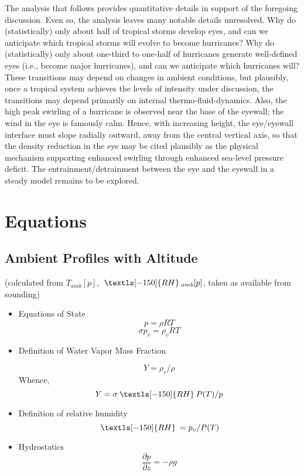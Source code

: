 \documentclass[preprint, prX]{revtex4}
\newcommand{\pd}[2]{\frac{\partial#1}{\partial#2}}
\newcommand{\rh}{\:\textls[-150]{RH}\:}
\begin{document}
The analysis that follows provides quantitative details in support of the foregoing discussion. Even so, the analysis leaves many notable details unresolved. Why do (statistically) only about half of tropical storms develop eyes, and can we anticipate which tropical storms will evolve to become hurricanes? Why do (statistically) only about one-third to one-half of hurricanes generate well-defined eyes (i.e., become major hurricanes), and can we anticipate which hurricanes will? These transitions may depend on changes in ambient conditions, but plausibly, once a tropical system achieves the levels of intensity under discussion, the transitions may depend primarily on internal thermo-fluid-dynamics. Also, the high peak swirling of a hurricane is observed near the base of the eyewall; the wind in the eye is famously calm. Hence, with increasing height, the eye/eyewall interface must slope radially outward, away from the central vertical axis, so that the density reduction in the eye may be cited plausibly as the physical mechanism supporting enhanced swirling through enhanced sea-level pressure deficit. The entrainment/detrainment between the eye and the eyewall in a steady model remains to be explored.

\section{Equations}

\subsection{Ambient Profiles with Altitude  }
(calculated from $T_{amb}[p]$, $ \rh_{amb}[p]$, taken as available from sounding)
\begin{itemize}

\item Equations of State
\begin{equation}
	p = \rho R T
\end{equation}
\begin{equation}
	\sigma p_v = \rho_v R T
\end{equation}

\item Definition of Water Vapor Mass Fraction

\begin{equation}
	Y = \rho_v / \rho
\end{equation}
Whence,
\begin{equation}
	Y = \sigma \rh P(T) / p
\end{equation}

\item Definition of relative humidity
\begin{equation}
	\rh = p_v / P(T)
\end{equation}

\item Hydrostatics
\begin{equation}
	\pd{p}{z} = -\rho g
\end{equation}

\end{itemize}
\end{document}
